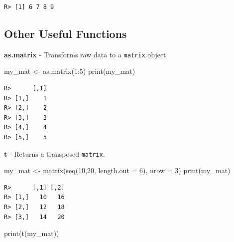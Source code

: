 \documentclass[
  12pt,
]{book}
\newenvironment{Shaded}{\begin{snugshade}}{\end{snugshade}}
\newcommand{\AttributeTok}[1]{\textcolor[rgb]{0.61,0.61,0.61}{#1}}
\newcommand{\DecValTok}[1]{\textcolor[rgb]{0.06,0.06,0.06}{#1}}
\newcommand{\FunctionTok}[1]{\textcolor[rgb]{0,0,0}{#1}}
\newcommand{\NormalTok}[1]{#1}
\newcommand{\OtherTok}[1]{\textcolor[rgb]{0.37,0.37,0.37}{#1}}
\newcommand{\SpecialCharTok}[1]{\textcolor[rgb]{0,0,0}{#1}}
\begin{document}
\begin{verbatim}
R> [1] 6 7 8 9
\end{verbatim}

\hypertarget{other-useful-functions-1}{%
\subsection{Other Useful Functions}\label{other-useful-functions-1}}

\textbf{as.matrix} - Transforms raw data to a \texttt{matrix} object. 

\begin{Shaded}
\begin{Highlighting}[]
\NormalTok{my\_mat }\OtherTok{\textless{}{-}} \FunctionTok{as.matrix}\NormalTok{(}\DecValTok{1}\SpecialCharTok{:}\DecValTok{5}\NormalTok{)}
\FunctionTok{print}\NormalTok{(my\_mat)}
\end{Highlighting}
\end{Shaded}

\begin{verbatim}
R>      [,1]
R> [1,]    1
R> [2,]    2
R> [3,]    3
R> [4,]    4
R> [5,]    5
\end{verbatim}

\textbf{t} - Returns a transposed \texttt{matrix}.  

\begin{Shaded}
\begin{Highlighting}[]
\NormalTok{my\_mat }\OtherTok{\textless{}{-}} \FunctionTok{matrix}\NormalTok{(}\FunctionTok{seq}\NormalTok{(}\DecValTok{10}\NormalTok{,}\DecValTok{20}\NormalTok{, }
                     \AttributeTok{length.out =} \DecValTok{6}\NormalTok{), }
                 \AttributeTok{nrow =} \DecValTok{3}\NormalTok{)}
\FunctionTok{print}\NormalTok{(my\_mat)}
\end{Highlighting}
\end{Shaded}

\begin{verbatim}
R>      [,1] [,2]
R> [1,]   10   16
R> [2,]   12   18
R> [3,]   14   20
\end{verbatim}

\begin{Shaded}
\begin{Highlighting}[]
\FunctionTok{print}\NormalTok{(}\FunctionTok{t}\NormalTok{(my\_mat))}
\end{Highlighting}
\end{Shaded}
\end{document}
